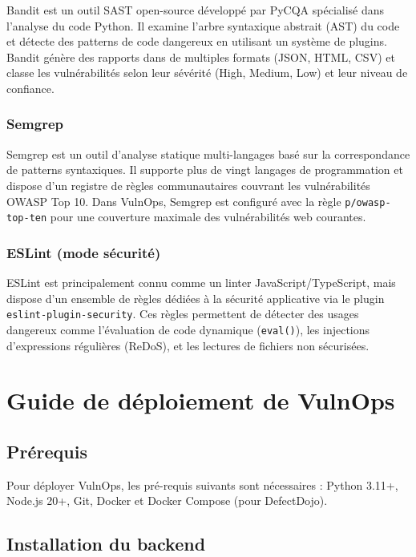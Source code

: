 \documentclass[12pt, a4paper, oneside]{report}
\begin{document}
Bandit \cite{banditdoc} est un outil SAST open-source développé par PyCQA
spécialisé dans l'analyse du code Python. Il examine l'arbre syntaxique abstrait
(AST) du code et détecte des patterns de code dangereux en utilisant un système
de plugins. Bandit génère des rapports dans de multiples formats (JSON, HTML, CSV)
et classe les vulnérabilités selon leur sévérité (High, Medium, Low) et leur
niveau de confiance.

\subsection{Semgrep}

Semgrep \cite{semgrepdoc} est un outil d'analyse statique multi-langages
basé sur la correspondance de patterns syntaxiques. Il supporte plus de vingt
langages de programmation et dispose d'un registre de règles communautaires
couvrant les vulnérabilités OWASP Top 10. Dans VulnOps, Semgrep est configuré
avec la règle \texttt{p/owasp-top-ten} pour une couverture maximale des
vulnérabilités web courantes.

\subsection{ESLint (mode sécurité)}

ESLint est principalement connu comme un linter JavaScript/TypeScript, mais
dispose d'un ensemble de règles dédiées à la sécurité applicative via le
plugin \texttt{eslint-plugin-security}. Ces règles permettent de détecter
des usages dangereux comme l'évaluation de code dynamique (\texttt{eval()}),
les injections d'expressions régulières (ReDoS), et les lectures de fichiers
non sécurisées.

\chapter{Guide de déploiement de VulnOps}
\label{annexe:deploiement}

\section{Prérequis}

Pour déployer VulnOps, les pré-requis suivants sont nécessaires :
Python 3.11+, Node.js 20+, Git, Docker et Docker Compose (pour DefectDojo).

\section{Installation du backend}
\end{document}
